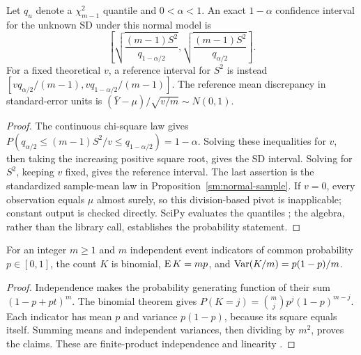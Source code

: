 \begin{corollary}
\label{sm:sd-interval}
Let \(q_u\) denote a \(\chi^2_{m-1}\) quantile and \(0<\alpha<1\).
An exact \(1-\alpha\) confidence interval for the unknown SD under this
normal model is
\[
 \left[\sqrt{\frac{(m-1)S^2}{q_{1-\alpha/2}}},
       \sqrt{\frac{(m-1)S^2}{q_{\alpha/2}}}\right].
\]
For a fixed theoretical \(v\), a reference interval for \(S^2\) is instead
\([vq_{\alpha/2}/(m-1),vq_{1-\alpha/2}/(m-1)]\). The reference
mean discrepancy in standard-error units is
\((\bar Y-\mu)/\sqrt{v/m}\sim N(0,1)\).
\end{corollary}
\begin{proof}
The continuous chi-square law gives
\(P(q_{\alpha/2}\leq(m-1)S^2/v\leq q_{1-\alpha/2})=1-\alpha\).
Solving these inequalities for \(v\), then taking the increasing positive
square root, gives the SD interval. Solving for \(S^2\), keeping \(v\)
fixed, gives the reference interval. The last assertion is the standardized
sample-mean law in Proposition~\ref{sm:normal-sample}. If \(v=0\), every
observation equals \(\mu\) almost surely, so this division-based pivot is
inapplicable; constant output is checked directly. SciPy evaluates the
quantiles \citep{scipystats}; the algebra, rather than the library call,
establishes the probability statement.
\end{proof}

\begin{proposition}
\label{sm:binomial}
For an integer \(m\geq1\) and \(m\) independent event indicators of common
probability \(p\in[0,1]\), the
count \(K\) is binomial, \(\operatorname{E} K=mp\), and
\(\operatorname{Var}(K/m)=p(1-p)/m\).
\end{proposition}
\begin{proof}
Independence makes the probability generating function of their sum
\((1-p+pt)^m\). The binomial theorem gives
\(P(K=j)=\binom mjp^j(1-p)^{m-j}\). Each indicator has mean \(p\)
and variance \(p(1-p)\), because its square equals itself. Summing means
and independent variances, then dividing by \(m^2\), proves the claims.
These are finite-product independence and linearity
\citep[Sections 1.6 and 2.1]{durrett2019}.
\end{proof}

